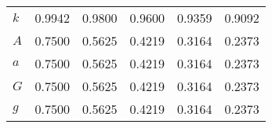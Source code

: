 \begin{center}
\begin{longtable}{lccccc}
$k       $	 & 	    0.9942	 & 	    0.9800	 & 	    0.9600	 & 	    0.9359	 & 	    0.9092 \\ 
$A       $	 & 	    0.7500	 & 	    0.5625	 & 	    0.4219	 & 	    0.3164	 & 	    0.2373 \\ 
$a       $	 & 	    0.7500	 & 	    0.5625	 & 	    0.4219	 & 	    0.3164	 & 	    0.2373 \\ 
$G       $	 & 	    0.7500	 & 	    0.5625	 & 	    0.4219	 & 	    0.3164	 & 	    0.2373 \\ 
$g       $	 & 	    0.7500	 & 	    0.5625	 & 	    0.4219	 & 	    0.3164	 & 	    0.2373 \\ 
\end{longtable}
 \end{center}
